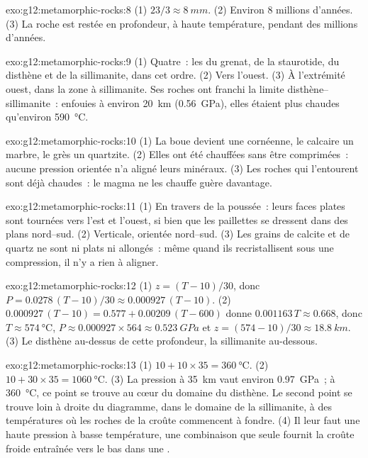 \begin{solution}{exo:g12:metamorphic-rocks:8}
(1) $23/3 \approx \qty{8}{mm}$. (2) Environ 8 millions d'années. (3) La
roche est restée en profondeur, à haute température, pendant des millions
d'années.
\end{solution}

\begin{solution}{exo:g12:metamorphic-rocks:9}
(1) Quatre~: les  du grenat, de la staurotide, du disthène et de
la sillimanite, dans cet ordre. (2) Vers l'ouest. (3) À l'extrémité ouest,
dans la zone à sillimanite. Ses roches ont franchi la limite
disthène--sillimanite~: enfouies à environ \qty{20}{km}
(\qty{0.56}{GPa}), elles étaient plus chaudes qu'environ
\qty{590}{\celsius}.
\end{solution}

\begin{solution}{exo:g12:metamorphic-rocks:10}
(1) La boue devient une cornéenne, le calcaire un marbre, le grès un
quartzite. (2) Elles ont été chauffées sans être comprimées~: aucune
pression orientée n'a aligné leurs minéraux. (3) Les roches qui l'entourent
sont déjà chaudes~: le magma ne les chauffe guère davantage.
\end{solution}

\begin{solution}{exo:g12:metamorphic-rocks:11}
(1) En travers de la poussée~: leurs faces plates sont tournées vers l'est
et l'ouest, si bien que les paillettes se dressent dans des plans
nord--sud. (2) Verticale, orientée nord--sud. (3) Les grains de calcite et
de quartz ne sont ni plats ni allongés~: même quand ils recristallisent
sous une compression, il n'y a rien à aligner.
\end{solution}

\begin{solution}{exo:g12:metamorphic-rocks:12}
(1) $z = (T - 10)/30$, donc $P = 0.0278\,(T - 10)/30 \approx
0.000927\,(T - 10)$. (2) $0.000927\,(T - 10) = 0.577 + 0.00209\,(T - 600)$
donne $0.001163\,T \approx 0.668$, donc $T \approx \qty{574}{\celsius}$, $P
\approx 0.000927 \times 564 \approx \qty{0.523}{GPa}$ et $z = (574 - 10)/30
\approx \qty{18.8}{km}$. (3) Le disthène au-dessus de cette profondeur, la
sillimanite au-dessous.
\end{solution}

\begin{solution}{exo:g12:metamorphic-rocks:13}
(1) $10 + 10 \times 35 = \qty{360}{\celsius}$. (2) $10 + 30 \times 35 =
\qty{1060}{\celsius}$. (3) La pression à \qty{35}{km} vaut environ
\qty{0.97}{GPa}~; à \qty{360}{\celsius}, ce point se trouve au cœur du
domaine du disthène. Le second point se trouve loin à droite du diagramme,
dans le domaine de la sillimanite, à des températures où les roches de la
croûte commencent à fondre. (4) Il leur faut une haute pression à basse
température, une combinaison que seule fournit la croûte froide entraînée
vers le bas dans une .
\end{solution}

